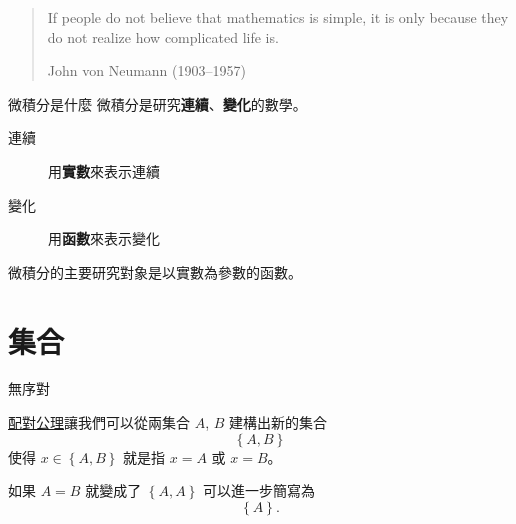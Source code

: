 \documentclass{Slideshow}
\newcommand{\mmhref}[2]{\href{http://us.metamath.org/mpeuni/#1.html}{#2}}
\begin{document}
\begin{frame}
    \begin{quote}
        If people do not believe that mathematics is simple, it is only because
        they do not realize how complicated life is.

        \begin{flushright}
            \textup{John von Neumann (1903--1957)}
        \end{flushright}
    \end{quote}
\end{frame}

\begin{frame}{微積分是什麼}
    微積分是研究\textbf{連續}、\textbf{變化}的數學。

    \begin{description}
        \item[連續] 用\textbf{實數}來表示連續
        \item[變化] 用\textbf{函數}來表示變化
    \end{description}

    微積分的主要研究對象是以實數為參數的函數。
\end{frame}

\section{集合}

\begin{frame}{無序對}
    \begin{definition}
        \newcommand{\thepair}{\left\{ A, B \right\}}
        \mmhref{ax-pr}{配對公理}讓我們可以從兩集合 $A$, $B$ 建構出新的集合
        \[ \thepair \]
        使得 $x \in \thepair$ 就是指 $x = A$ 或 $x = B$。
    \end{definition}

    如果 $A = B$ 就變成了 $\left\{ A, A \right\}$ 可以進一步簡寫為
    \[ \left\{ A \right\}.\]
\end{frame}
\end{document}
